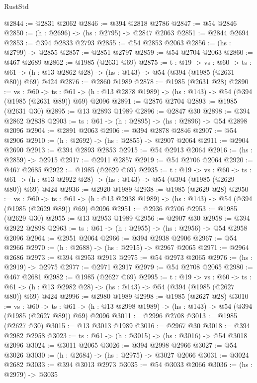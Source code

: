 \begin{lexlean}{RustStd}
\begin{coremodule}
{\begin{coremodule}
{{{{{{{{@2844 := @2831 @2062
@2846 := @394 @2818 @2786
@2847 := @54 @2846
@2850 := (h : @2696) -> (hs : @2795) -> @2847 @2063
@2851 := @2844 @2694
@2853 := @394 @2833 @2793
@2855 := @54 @2853 @2063
@2856 := (hs : @2799) -> @2855
@2857 := @2851 @2797
@2859 := @54 @2704 @2063
@2860 := @467 @2689
@2862 := @1985 (@2631 @69)
@2875 := {t : @19} ->
  {vs : @60} ->
  {ts : @61} -> (h : @13 @2862 @28) -> (hs : @143) -> @54 (@394 (@1985 (@2631 @80)) @69) @424
@2876 := @2860 @1989
@2878 := @1985 (@2631 @28)
@2890 := {vs : @60} ->
  {ts : @61} -> (h : @13 @2878 @1989) -> (hs : @143) -> @54 (@394 (@1985 (@2631 @89)) @69) @2096
@2891 := @2876 @2704
@2893 := @1985 (@2631 @30)
@2895 := @13 @2893 @1989
@2896 := @2847 @30
@2898 := @394 @2862 @2838
@2903 := {ts : @61} -> (h : @2895) -> (hs : @2896) -> @54 @2898 @2096
@2904 := @2891 @2063
@2906 := @394 @2878 @2846
@2907 := @54 @2906
@2910 := (h : @2692) -> (hs : @2855) -> @2907 @2064
@2911 := @2904 @2690
@2913 := @394 @2893 @2853
@2915 := @54 @2913 @2064
@2916 := (hs : @2859) -> @2915
@2917 := @2911 @2857
@2919 := @54 @2706 @2064
@2920 := @467 @2685
@2922 := @1985 (@2629 @69)
@2935 := {t : @19} ->
  {vs : @60} ->
  {ts : @61} -> (h : @13 @2922 @28) -> (hs : @143) -> @54 (@394 (@1985 (@2629 @80)) @69) @424
@2936 := @2920 @1989
@2938 := @1985 (@2629 @28)
@2950 := {vs : @60} ->
  {ts : @61} -> (h : @13 @2938 @1989) -> (hs : @143) -> @54 (@394 (@1985 (@2629 @89)) @69) @2096
@2951 := @2936 @2706
@2953 := @1985 (@2629 @30)
@2955 := @13 @2953 @1989
@2956 := @2907 @30
@2958 := @394 @2922 @2898
@2963 := {ts : @61} -> (h : @2955) -> (hs : @2956) -> @54 @2958 @2096
@2964 := @2951 @2064
@2966 := @394 @2938 @2906
@2967 := @54 @2966
@2970 := (h : @2688) -> (hs : @2915) -> @2967 @2065
@2971 := @2964 @2686
@2973 := @394 @2953 @2913
@2975 := @54 @2973 @2065
@2976 := (hs : @2919) -> @2975
@2977 := @2971 @2917
@2979 := @54 @2708 @2065
@2980 := @467 @2681
@2982 := @1985 (@2627 @69)
@2995 := {t : @19} ->
  {vs : @60} ->
  {ts : @61} -> (h : @13 @2982 @28) -> (hs : @143) -> @54 (@394 (@1985 (@2627 @80)) @69) @424
@2996 := @2980 @1989
@2998 := @1985 (@2627 @28)
@3010 := {vs : @60} ->
  {ts : @61} -> (h : @13 @2998 @1989) -> (hs : @143) -> @54 (@394 (@1985 (@2627 @89)) @69) @2096
@3011 := @2996 @2708
@3013 := @1985 (@2627 @30)
@3015 := @13 @3013 @1989
@3016 := @2967 @30
@3018 := @394 @2982 @2958
@3023 := {ts : @61} -> (h : @3015) -> (hs : @3016) -> @54 @3018 @2096
@3024 := @3011 @2065
@3026 := @394 @2998 @2966
@3027 := @54 @3026
@3030 := (h : @2684) -> (hs : @2975) -> @3027 @2066
@3031 := @3024 @2682
@3033 := @394 @3013 @2973
@3035 := @54 @3033 @2066
@3036 := (hs : @2979) -> @3035
}}}}}}}}
\end{coremodule}}
\end{coremodule}
\end{lexlean}
